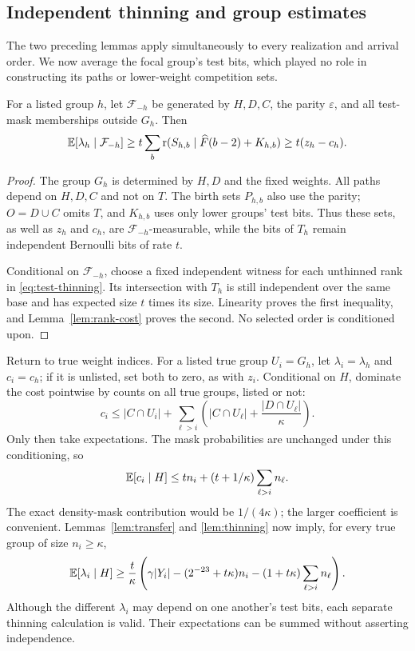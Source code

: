 \subsection{Independent thinning and group estimates}

The two preceding lemmas apply simultaneously to every realization and
arrival order. We now average the focal group's test bits, which played
no role in constructing its paths or lower-weight competition sets.

\begin{lemma}\label{lem:thinning}
For a listed group $h$, let $\mathcal F_{-h}$ be generated by $H,D,C$,
the parity $\varepsilon$, and all test-mask memberships outside $G_h$.
Then
\begin{equation}\label{eq:test-thinning}
 \mathbb E[\lambda_h\mid\mathcal F_{-h}]
 \ge t\sum_b\operatorname{r}(S_{h,b}\mid\widehat F(b-2)+K_{h,b})
 \ge t(z_h-c_h).
\end{equation}
\end{lemma}
\begin{proof}
The group $G_h$ is determined by $H,D$ and the fixed weights. All paths
depend on $H,D,C$ and not on $T$. The birth sets $P_{h,b}$ also use the
parity; $O=D\cup C$ omits $T$, and $K_{h,b}$ uses only lower groups' test
bits. Thus these sets, as well as $z_h$ and $c_h$, are
$\mathcal F_{-h}$-measurable, while the bits of $T_h$ remain independent
Bernoulli bits of rate $t$.

Conditional on $\mathcal F_{-h}$, choose a fixed independent witness for
each unthinned rank in \eqref{eq:test-thinning}. Its intersection with
$T_h$ is still independent over the same base and has expected size $t$
times its size. Linearity proves the first inequality, and
Lemma~\ref{lem:rank-cost} proves the second. No selected order is
conditioned upon.
\end{proof}

Return to true weight indices. For a listed true group $U_i=G_h$, let
$\lambda_i=\lambda_h$ and $c_i=c_h$; if it is unlisted, set both to zero,
as with $z_i$. Conditional on $H$, dominate the cost pointwise by counts
on all true groups, listed or not:
\[
 c_i\le |C\cap U_i|+
      \sum_{\ell>i}\left(|C\cap U_\ell|+\frac{|D\cap U_\ell|}{\kappa}\right).
\]
Only then take expectations. The mask probabilities are unchanged under
this conditioning, so
\begin{equation}\label{eq:expected-cost}
 \mathbb E[c_i\mid H]\le t n_i+(t+1/\kappa)\sum_{\ell>i}n_\ell.
\end{equation}
The exact density-mask contribution would be $1/(4\kappa)$; the larger
coefficient is convenient. Lemmas~\ref{lem:transfer} and
\ref{lem:thinning} now imply, for every true group of size
$n_i\ge\kappa$,
\begin{equation}\label{eq:group-payoff}
 \mathbb E[\lambda_i\mid H]\ge\frac t\kappa
 \left(\gamma|Y_i|-(2^{-23}+t\kappa)n_i
       -(1+t\kappa)\sum_{\ell>i}n_\ell\right).
\end{equation}
Although the different $\lambda_i$ may depend on one another's test bits,
each separate thinning calculation is valid. Their expectations can be
summed without asserting independence.

